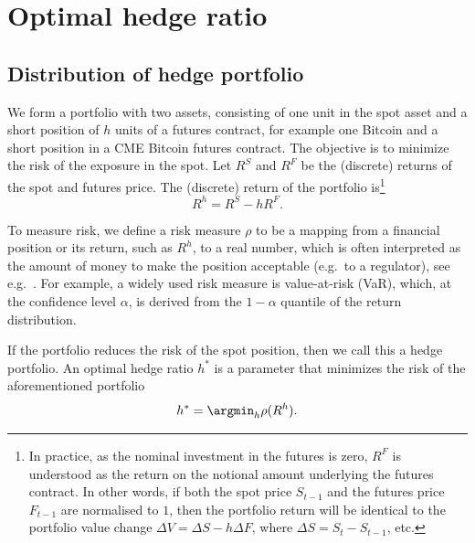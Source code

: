 \section{Optimal hedge ratio}\label{sec:optimal-hedge-ratio}

\subsection{Distribution of hedge portfolio}\label{subsec:DHP}
We form a portfolio with two assets, consisting of one unit in the
spot asset and a short position of $h$ units of a futures contract,
for example one Bitcoin and a short position in a CME Bitcoin
futures contract. 
The objective is to minimize the risk of the exposure in the spot. 
Let $R^S$ and $R^F$ be the (discrete) returns of the spot and
futures price. The (discrete) return of the portfolio is\footnote{%
In practice, as the nominal investment in the futures is zero, $R^F$
is understood as the return on the notional amount underlying the
futures contract. In other words, if both the spot price $S_{t-1}$
and the futures price $F_{t-1}$ are 
normalised to $1$, then the portfolio return will be identical to the
portfolio value change $\Delta V = \Delta S - h \Delta F$, where $\Delta S =
S_t-S_{t-1}$, etc.}
\begin{equation*}
R^h = R^S -h R^F.
\end{equation*}

To measure risk, we define a risk measure $\rho$ to be a mapping from
a financial position or its return, such as $R^h$, to a real number, which is often
interpreted as the amount of money to make the position acceptable
(e.g.\ to a regulator), see e.g.\ \citep{Foellmer2002}.
For example, a widely used risk measure is value-at-risk (VaR), which,
at the confidence level $\alpha$,
is derived from the $1-\alpha$ quantile of the return distribution. %

If the portfolio reduces the risk of the spot position, then
we call this a hedge portfolio.
An optimal hedge ratio $h^*$ is a parameter that
minimizes the risk of the aforementioned portfolio
\begin{equation*}
h^* = \argmin_h \rho(R^h).
\end{equation*}

